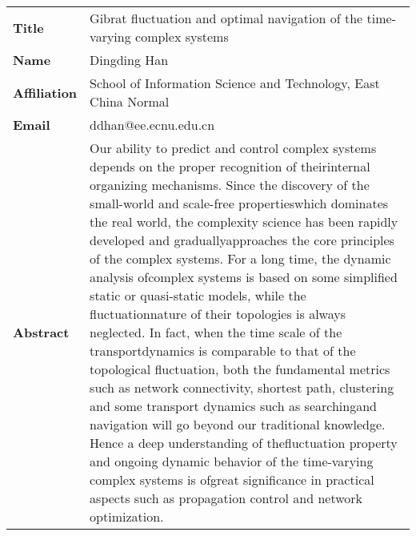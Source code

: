 \documentclass[oneside,A4paper,12pt]{article}
\begin{document}
\newpage
\begin{longtable}{p{2cm}p{14cm}}
\toprule
\textbf{Title} & Gibrat fluctuation and optimal navigation of the time-varying complex systems\\
\textbf{Name} & Dingding Han\\
\textbf{Affiliation} & School of Information Science and Technology, East China Normal\\
\textbf{Email} & ddhan@ee.ecnu.edu.cn\\
\textbf{Abstract} & Our ability to predict and control complex systems depends on the proper recognition of theirinternal organizing mechanisms. Since the discovery of the small-world and scale-free propertieswhich dominates the real world, the complexity science has been rapidly developed and graduallyapproaches the core principles of the complex systems. For a long time, the dynamic analysis ofcomplex systems is based on some simplified static or quasi-static models, while the fluctuationnature of their topologies is always neglected. In fact, when the time scale of the transportdynamics is comparable to that of the topological fluctuation, both the fundamental metrics such as network connectivity, shortest path, clustering and some transport dynamics such as searchingand navigation will go beyond our traditional knowledge. Hence a deep understanding of thefluctuation property and ongoing dynamic behavior of the time-varying complex systems is ofgreat significance in practical aspects such as propagation control and network optimization.\\
\bottomrule
\end{longtable}
\end{document}
